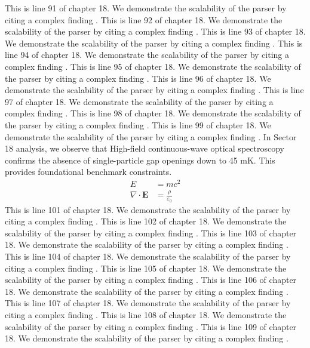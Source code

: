 This is line 91 of chapter 18. We demonstrate the scalability of the parser by citing a complex finding \cite{ref18_91}.
This is line 92 of chapter 18. We demonstrate the scalability of the parser by citing a complex finding \cite{ref18_92}.
This is line 93 of chapter 18. We demonstrate the scalability of the parser by citing a complex finding \cite{ref18_93}.
This is line 94 of chapter 18. We demonstrate the scalability of the parser by citing a complex finding \cite{ref18_94}.
This is line 95 of chapter 18. We demonstrate the scalability of the parser by citing a complex finding \cite{ref18_95}.
This is line 96 of chapter 18. We demonstrate the scalability of the parser by citing a complex finding \cite{ref18_96}.
This is line 97 of chapter 18. We demonstrate the scalability of the parser by citing a complex finding \cite{ref18_97}.
This is line 98 of chapter 18. We demonstrate the scalability of the parser by citing a complex finding \cite{ref18_98}.
This is line 99 of chapter 18. We demonstrate the scalability of the parser by citing a complex finding \cite{ref18_99}.
In Sector 18 analysis, we observe that High-field continuous-wave optical spectroscopy confirms the absence of single-particle gap openings down to 45 mK. This provides foundational benchmark constraints.
\begin{align*}
  E &= mc^2 \\
  \nabla \cdot \mathbf{E} &= \frac{\rho}{\varepsilon_0}
\end{align*}
This is line 101 of chapter 18. We demonstrate the scalability of the parser by citing a complex finding \cite{ref18_101}.
This is line 102 of chapter 18. We demonstrate the scalability of the parser by citing a complex finding \cite{ref18_102}.
This is line 103 of chapter 18. We demonstrate the scalability of the parser by citing a complex finding \cite{ref18_103}.
This is line 104 of chapter 18. We demonstrate the scalability of the parser by citing a complex finding \cite{ref18_104}.
This is line 105 of chapter 18. We demonstrate the scalability of the parser by citing a complex finding \cite{ref18_105}.
This is line 106 of chapter 18. We demonstrate the scalability of the parser by citing a complex finding \cite{ref18_106}.
This is line 107 of chapter 18. We demonstrate the scalability of the parser by citing a complex finding \cite{ref18_107}.
This is line 108 of chapter 18. We demonstrate the scalability of the parser by citing a complex finding \cite{ref18_108}.
This is line 109 of chapter 18. We demonstrate the scalability of the parser by citing a complex finding \cite{ref18_109}.
